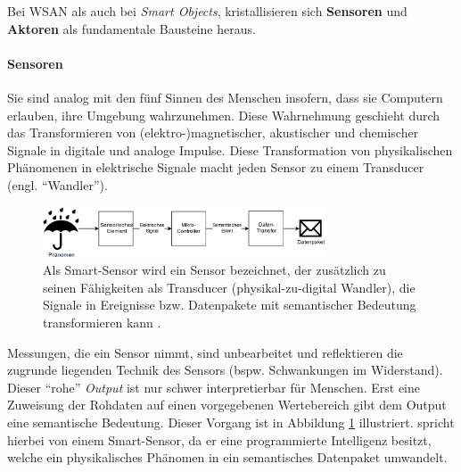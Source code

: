 Bei \ac{WSAN} als auch bei \textit{Smart Objects}, kristallisieren sich  \textbf{Sensoren} und \textbf{Aktoren} als fundamentale Bausteine heraus. 
\paragraph{Sensoren} Sie sind analog mit den fünf Sinnen des Menschen insofern, dass sie Computern erlauben, ihre Umgebung wahrzunehmen. Diese Wahrnehmung geschieht durch das Transformieren von (elektro-)magnetischer, akustischer und chemischer Signale in digitale und analoge Impulse. Diese Transformation von physikalischen Phänomenen in elektrische Signale macht jeden Sensor zu einem Transducer (engl. "`Wandler"'). 
\begin{figure}[h]
    \centering
    \includegraphics[width=0.75\textwidth]{bilder/chapter2/smartsensor.png}
    \caption{Als Smart-Sensor wird ein Sensor bezeichnet, der zusätzlich zu seinen Fähigkeiten als Transducer (physikal-zu-digital Wandler), die Signale in Ereignisse bzw. Datenpakete mit semantischer Bedeutung transformieren kann \cite{rayes2017internet}.}
    \label{fig:Smartsensor}
\end{figure}
Messungen, die ein Sensor nimmt, sind unbearbeitet und reflektieren die zugrunde liegenden Technik des Sensors (bspw. Schwankungen im Widerstand). Dieser "`rohe"' \textit{Output} ist nur schwer interpretierbar für Menschen. Erst eine Zuweisung der Rohdaten auf einen vorgegebenen Wertebereich gibt dem Output eine semantische Bedeutung. Dieser Vorgang ist in Abbildung \ref{fig:Smartsensor} illustriert. \cite{rayes2017internet} spricht hierbei von einem Smart-Sensor, da er eine programmierte Intelligenz besitzt, welche ein physikalisches Phänomen in ein semantisches Datenpaket umwandelt.

